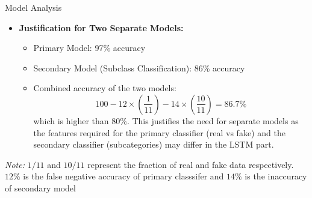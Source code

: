 \documentclass{beamer}
\begin{document}
\begin{frame}{Model Analysis}

    \begin{itemize}
        \item \textbf{Justification for Two Separate Models:}
        \begin{itemize}
            \item Primary Model: 97\% accuracy
            \item Secondary Model (Subclass Classification): 86\% accuracy
            \item Combined accuracy of the two models:
            \[
            100 - 12 \times \left(\frac{1}{11}\right) - 14 \times \left(\frac{10}{11}\right) = 86.7\%
            \]
            which is higher than 80\%. This justifies the need for separate models as the features required for the primary classifier (real vs fake) and the secondary classifier (subcategories) may differ in the LSTM part.
        \end{itemize}
    \end{itemize}

    \vspace{0.5cm} %

    \footnotesize
    \textit{Note:} $1/11$ and $10/11$ represent the fraction of real and fake data respectively.
    $12\%$ is the false negative accuracy of primary classsifer and
    $14\%$ is the inaccuracy of secondary model
    
\end{frame}
\end{document}
